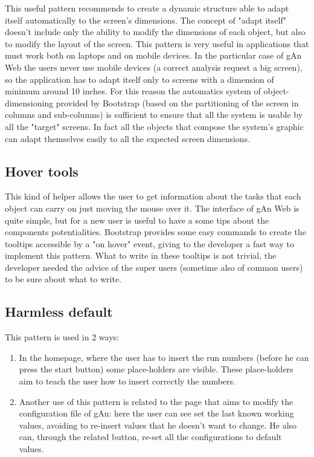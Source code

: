 This useful pattern recommends to create a dynamic structure able to adapt itself automatically to the screen's dimensions. The concept of "adapt itself" doesn't include only the ability to modify the dimensions of each object, but also to modify the layout of the screen. This pattern is very useful in applications that must work both on laptops and on mobile devices. In the particular case of gAn Web the users never use mobile devices (a correct analysis request a big screen), so the application has to adapt itself only to screens with a dimension of minimum around 10 inches. For this reason the automatics system of object-dimensioning provided by Bootstrap (based on the partitioning of the screen in columns and sub-columns) is sufficient to ensure that all the system is usable by all the "target" screens. In fact all the objects that compose the system's graphic can adapt themselves easily to all the expected screen dimensions. 


\subsection{Hover tools}

This kind of helper allows the user to get information about the tasks that each object can carry on just moving the mouse over it. 
The interface of gAn Web is quite simple, but for a new user is useful to have a some tips about the components potentialities. Bootstrap provides some easy commands to create the tooltips accessible by a "on hover" event, giving to the developer a fast way to implement this pattern. What to write in these tooltips is not trivial, the developer needed the advice of the super users (sometime also of common users) to be sure about what to write. 


\subsection{Harmless default}

This pattern is used in 2 ways:
\begin{enumerate}

\item In the homepage, where the user has to insert the run numbers (before he can press the start button) some place-holders are visible. 
These place-holders aim to teach the user how to insert correctly the numbers.

\item Another use of this pattern is related to the page that aims to modify the configuration file of gAn: here the user can see set the last known working values, avoiding to re-insert values that he doesn't want to change. He also can, through the related  button, re-set all the configurations to default values.

\end{enumerate}

